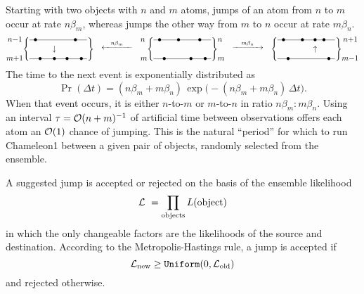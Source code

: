 Starting with two objects with $n$ and $m$ atoms, jumps of an atom from $n$ to $m$ occur at rate $n\beta_m$,
whereas jumps the other way from $m$ to $n$ occur at rate $m\beta_n$.
$$
\lower 12pt\vbox{ \hbox{$\,n-$1}
                  \hbox{\ }
                  \hbox{$m+$1}
                }
\Bigg\{
\lower 12pt\vbox{ \hbox{{\raise2pt\hbox to 74pt{\hrulefill}} \hskip -72pt $\bullet$ \hskip 16pt \hskip 8pt \hskip 8pt \hskip 8pt \hskip 3pt $\bullet$ \hskip 9pt}
                  \hbox{\hskip 29.5pt $\downarrow$}
                  \hbox{{\raise2pt\hbox to 74pt{\hrulefill}} \hskip -66pt $\bullet$ \hskip 10pt $\bullet$ \hskip 8pt $\bullet$ \hskip 10pt $\bullet$ \hskip 2pt}
                }
\Bigg\}
\hskip10pt
\raise 2pt\hbox{${\buildrel n\beta_m \over {\hbox to 40pt{\leftarrowfill}}} $}
\hskip10pt
\lower 12pt\vbox{ \hbox{$n$}
                  \hbox{\ }
                  \hbox{$m$}
                }
\Bigg\{
\lower 12pt\vbox{ \hbox{{\raise2pt\hbox to 74pt{\hrulefill}} \hskip -72pt $\bullet$ \hskip 16pt $\bullet$ \hskip 8pt \hskip 8pt \hskip 3pt $\bullet$ \hskip 9pt}
                  \hbox{\ }
                  \hbox{{\raise2pt\hbox to 74pt{\hrulefill}} \hskip -66pt $\bullet$ \hskip 10pt \hskip 8pt \hskip 8pt $\bullet$ \hskip 10pt $\bullet$ \hskip 2pt}
                }
\Bigg\}
\lower 12pt\vbox{ \hbox{$n$}
                  \hbox{\ }
                  \hbox{$m$}
                }
\hskip10pt
\raise 2pt\hbox{${\buildrel m\beta_n \over {\hbox to 40pt{\rightarrowfill}}} $}
\hskip10pt
\Bigg\{
\lower 12pt\vbox{ \hbox{{\raise2pt\hbox to 74pt{\hrulefill}} \hskip -72pt $\bullet$ \hskip 16pt $\bullet$ \hskip 8pt $\bullet$ \hskip 3pt $\bullet$ \hskip 9pt}
                  \hbox{\hskip 46pt $\uparrow$}
                  \hbox{{\raise2pt\hbox to 74pt{\hrulefill}} \hskip -66pt $\bullet$ \hskip 10pt \hskip 8pt \hskip 8pt \hskip 8pt \hskip 10pt $\bullet$ \hskip 2pt}
                }
\Bigg\}
\lower 12pt\vbox{ \hbox{$\,n+$1}
                  \hbox{\ }
                  \hbox{$m-$1}
                }
$$
The time to the next event is exponentially distributed as
$$
    \Pr(\Delta t) = (n\beta_m + m\beta_n)\,\exp\!\big(-(n\beta_m + m\beta_n)\,\Delta t\big).
$$
When that event occurs, it is either $n$-to-$m$ or $m$-to-$n$ in ratio $n\beta_m\!:\!m\beta_n$.
Using an interval $\tau = {\cal O}(n+m)^{-1}$ of artificial time between observations offers each atom an ${\cal O}(1)$ chance of jumping.
This is the natural ``period'' for which to run Chameleon1 between a given pair of objects, randomly selected from the ensemble.

A suggested jump is accepted or rejected on the basis of the ensemble likelihood 
$$
  {\cal L}\ = \prod_{\rm objects} L({\rm object})
$$
in which the only changeable factors are the likelihoods of the source and destination.
According to the Metropolis-Hastings rule, a jump is accepted if
$$
  {\cal L}_{\rm new} \ge {\tt Uniform}(0,{\cal L}_{\rm old})
$$
and rejected otherwise.

